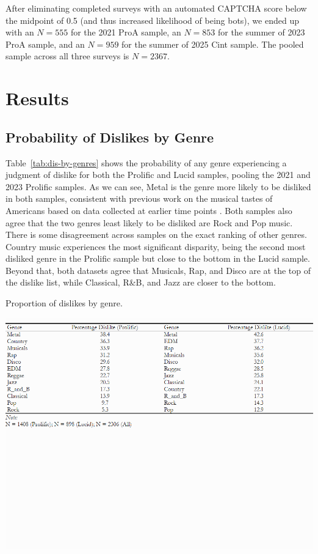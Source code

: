 \documentclass[12pt]{article}
\begin{document}
After eliminating completed surveys with an automated CAPTCHA score below the midpoint of 0.5 (and thus increased likelihood of being bots), we ended up with an $N = 555$ for the 2021 ProA sample, an $N = 853$ for the summer of 2023 ProA sample, and an $N = 959$ for the summer of 2025 Cint sample. The pooled sample across all three surveys is $N = 2367$.  

\section*{Results}
\subsection*{Probability of Dislikes by Genre}
Table~\ref{tab:dis-by-genres} shows the probability of any genre experiencing a judgment of dislike for both the Prolific and Lucid samples, pooling the 2021 and 2023 Prolific samples. As we can see, Metal is the genre more likely to be disliked in both samples, consistent with previous work on the musical tastes of Americans based on data collected at earlier time points \citep{bryson1996anything-311, lizardo2015musical-8c6}. Both samples also agree that the two genres least likely to be disliked are Rock and Pop music. There is some disagreement across samples on the exact ranking of other genres. Country music experiences the most significant disparity, being the second most disliked genre in the Prolific sample but close to the bottom in the Lucid sample. Beyond that, both datasets agree that Musicals, Rap, and Disco are at the top of the dislike list, while Classical, R\&B, and Jazz are closer to the bottom. 

\begin{table}[ht!]
    \caption{Proportion of dislikes by genre.}
    \includegraphics[trim={0 10cm 0 0},clip, width=1.0\textwidth]{Tabs/desc-tab-dislike.png}
    \label{tab:dis-by-genres}
\end{table}
\end{document}
